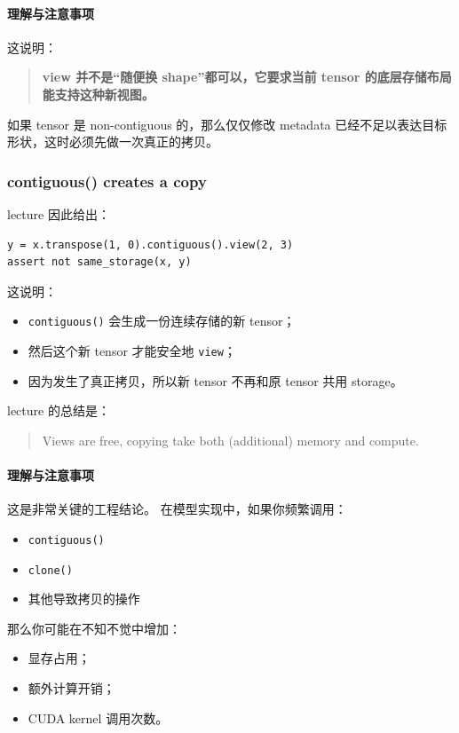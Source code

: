 \documentclass[a4paper,UTF8]{article}
\numberwithin{equation}{section}
\begin{document}
\paragraph{理解与注意事项}
这说明：
\begin{quote}
\textbf{view 并不是“随便换 shape”都可以，它要求当前 tensor 的底层存储布局能支持这种新视图。}
\end{quote}

如果 tensor 是 non-contiguous 的，那么仅仅修改 metadata 已经不足以表达目标形状，这时必须先做一次真正的拷贝。

\subsubsection{contiguous() creates a copy}

lecture 因此给出：
\begin{verbatim}
y = x.transpose(1, 0).contiguous().view(2, 3)
assert not same_storage(x, y)
\end{verbatim}

这说明：
\begin{itemize}
    \item \verb|contiguous()| 会生成一份连续存储的新 tensor；
    \item 然后这个新 tensor 才能安全地 \verb|view|；
    \item 因为发生了真正拷贝，所以新 tensor 不再和原 tensor 共用 storage。
\end{itemize}

lecture 的总结是：
\begin{quote}
Views are free, copying take both (additional) memory and compute.
\end{quote}

\paragraph{理解与注意事项}
这是非常关键的工程结论。  
在模型实现中，如果你频繁调用：
\begin{itemize}
    \item \verb|contiguous()|
    \item \verb|clone()|
    \item 其他导致拷贝的操作
\end{itemize}
那么你可能在不知不觉中增加：
\begin{itemize}
    \item 显存占用；
    \item 额外计算开销；
    \item CUDA kernel 调用次数。
\end{itemize}
\end{document}
